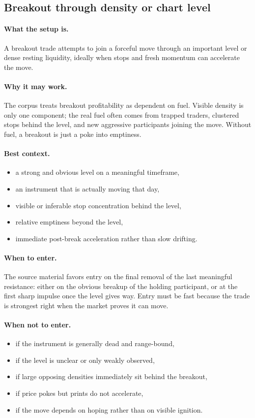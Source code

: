 \subsection{Breakout through density or chart level}

\paragraph{What the setup is.} A breakout trade attempts to join a forceful move through an important level or dense resting liquidity, ideally when stops and fresh momentum can accelerate the move.

\paragraph{Why it may work.} The corpus treats breakout profitability as dependent on fuel. Visible density is only one component; the real fuel often comes from trapped traders, clustered stops behind the level, and new aggressive participants joining the move. Without fuel, a breakout is just a poke into emptiness.

\paragraph{Best context.}
\begin{itemize}
\item a strong and obvious level on a meaningful timeframe,
\item an instrument that is actually moving that day,
\item visible or inferable stop concentration behind the level,
\item relative emptiness beyond the level,
\item immediate post-break acceleration rather than slow drifting.
\end{itemize}

\paragraph{When to enter.} The source material favors entry on the final removal of the last meaningful resistance: either on the obvious breakup of the holding participant, or at the first sharp impulse once the level gives way. Entry must be fast because the trade is strongest right when the market proves it can move.

\paragraph{When not to enter.}
\begin{itemize}
\item if the instrument is generally dead and range-bound,
\item if the level is unclear or only weakly observed,
\item if large opposing densities immediately sit behind the breakout,
\item if price pokes but prints do not accelerate,
\item if the move depends on hoping rather than on visible ignition.
\end{itemize}

